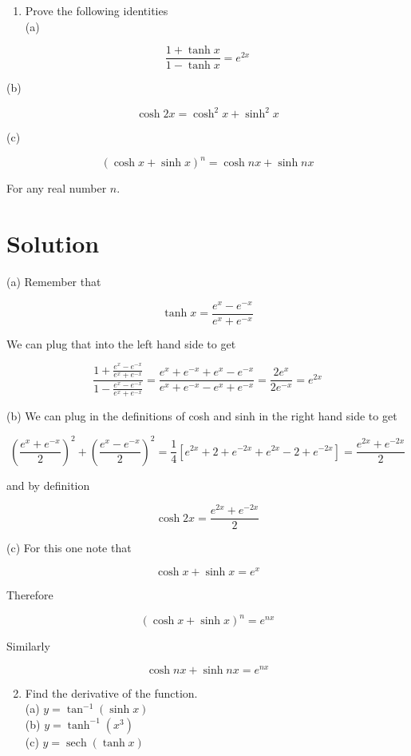 \documentclass[10pt]{article}
\begin{document}
\begin{enumerate}
  \item Prove the following identities\\
(a)
\end{enumerate}

$$
\frac{1+\tanh x}{1-\tanh x}=e^{2 x}
$$

(b)

$$
\cosh 2 x=\cosh ^{2} x+\sinh ^{2} x
$$

(c)

$$
(\cosh x+\sinh x)^{n}=\cosh n x+\sinh n x
$$

For any real number $n$.

\section*{Solution}
(a) Remember that

$$
\tanh x=\frac{e^{x}-e^{-x}}{e^{x}+e^{-x}}
$$

We can plug that into the left hand side to get

$$
\frac{1+\frac{e^{x}-e^{-x}}{e^{x}+e^{-x}}}{1-\frac{e^{x}-e^{-x}}{e^{x}+e^{-x}}}=\frac{e^{x}+e^{-x}+e^{x}-e^{-x}}{e^{x}+e^{-x}-e^{x}+e^{-x}}=\frac{2 e^{x}}{2 e^{-x}}=e^{2 x}
$$

(b) We can plug in the definitions of cosh and sinh in the right hand side to get

$$
\left(\frac{e^{x}+e^{-x}}{2}\right)^{2}+\left(\frac{e^{x}-e^{-x}}{2}\right)^{2}=\frac{1}{4}\left[e^{2 x}+2+e^{-2 x}+e^{2 x}-2+e^{-2 x}\right]=\frac{e^{2 x}+e^{-2 x}}{2}
$$

and by definition

$$
\cosh 2 x=\frac{e^{2 x}+e^{-2 x}}{2}
$$

(c) For this one note that

$$
\cosh x+\sinh x=e^{x}
$$

Therefore

$$
(\cosh x+\sinh x)^{n}=e^{n x}
$$

Similarly

$$
\cosh n x+\sinh n x=e^{n x}
$$

\begin{enumerate}
  \setcounter{enumi}{1}
  \item Find the derivative of the function.\\
(a) $y=\tan ^{-1}(\sinh x)$\\
(b) $y=\tanh ^{-1}\left(x^{3}\right)$\\
(c) $y=\operatorname{sech}(\tanh x)$
\end{enumerate}
\end{document}
